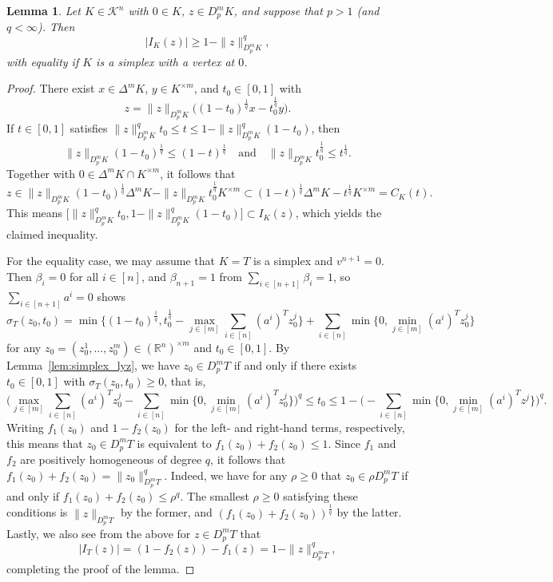 \documentclass{amsart}
\newtheorem{lemma}[theorem]{Lemma}
\newcommand\R{\mathbb{R}}
\newcommand\CK{\mathcal{K}}
\newcommand{\diff}[3]{D_{#1}^{#2} #3}
\newcommand{\diag}[2]{\Delta^{#1} #2}
\newcommand{\lyz}[4]{C_{#3} (#4)}
\newcommand{\interval}[4]{I_{#3} (#4)}
\newcommand{\sumfunc}[5]{\sigma_{#3}(#4,#5)}
\newcommand{\cartesian}[2]{#1^{\times #2}}
\begin{document}
\begin{lemma}\label{lem:general_iz}
Let $K \in \CK^n$ with $0 \in K$, $z \in \diff{p}{m}{K}$,
and suppose that $p > 1$ (and $q < \infty$).
Then
\[
	|\interval{p}{m}{K}{z}|
	\geq 1 - \|z\|_{\diff{p}{m}{K}}^q,
\]
with equality if $K$ is a simplex with a vertex at $0$.
\end{lemma}
\begin{proof}
There exist $x \in \diag{m}{K}$, $y \in \cartesian{K}{m}$, and $t_0 \in [0,1]$ with
\[
	z
	= \|z\|_{\diff{p}{m}{K}} \Big( (1-t_0)^{\frac{1}{q}} x - t_0^{\frac{1}{q}} y \Big).
\]
If $t \in [0,1]$ satisfies $\|z\|_{\diff{p}{m}{K}}^q t_0 \leq t \leq 1 - \|z\|_{\diff{p}{m}{K}}^q (1-t_0)$, then
\[
	\|z\|_{\diff{p}{m}{K}} (1-t_0)^{\frac{1}{q}} \leq (1-t)^{\frac{1}{q}}
		\quad \text{and} \quad
	\|z\|_{\diff{p}{m}{K}} t_0^{\frac{1}{q}} \leq t^{\frac{1}{q}}.
\]
Together with $0 \in \diag{m}{K} \cap \cartesian{K}{m}$, it follows that
\[
	z
	\in \|z\|_{\diff{p}{m}{K}} (1-t_0)^{\frac{1}{q}} \diag{m}{K} - \|z\|_{\diff{p}{m}{K}} t_0^{\frac{1}{q}} \cartesian{K}{m}
	\subset (1-t)^{\frac{1}{q}} \diag{m}{K} - t^{\frac{1}{q}} \cartesian{K}{m}
	= \lyz{p}{m}{K}{t}.
\]
This means $\big [\|z\|_{\diff{p}{m}{K}}^q t_0, 1 - \|z\|_{\diff{p}{m}{K}}^q (1-t_0) \big] \subset \interval{p}{m}{K}{z}$, which yields the claimed inequality.

For the equality case, we may assume that $K = T$ is a simplex and $v^{n+1} = 0$.
Then $\beta_i = 0$ for all $i \in [n]$, and $\beta_{n+1} = 1$ from $\sum_{i \in [n+1]} \beta_i = 1$, so $\sum_{i\in[n+1]} a^i = 0$ shows
\[
	\sumfunc{p}{m}{T}{z_0}{t_0}
	= \min \bigg\{ (1-t_0)^{\frac{1}{q}}, t_0^{\frac{1}{q}} - \max_{j \in [m]} \sum_{i \in [n]} (a^i)^T z_0^j \bigg\} + \sum_{i \in [n]} \min \bigg\{ 0, \min_{j \in [m]} (a^i)^T z_0^j \bigg\}
\]
for any $z_0 = (z_0^1, \dots, z_0^m) \in \cartesian{(\R^n)}{m}$ and $t_0 \in [0,1]$.
By Lemma~\ref{lem:simplex_lyz}, we have $z_0 \in \diff{p}{m}{T}$ if and only if there exists $t_0 \in [0,1]$ with $\sumfunc{p}{m}{T}{z_0}{t_0} \geq 0$, that is,
\[
	\Bigg( \max_{j \in [m]} \sum_{i \in [n]} (a^i)^T z_0^j - \sum_{i \in [n]} \min \bigg\{ 0, \min_{j \in [m]} (a^i)^T z_0^j \bigg\} \Bigg)^q
	\leq t_0
	\leq 1 - \Bigg( - \sum_{i \in [n]} \min \bigg\{ 0, \min_{j \in [m]} (a^i)^T z^j \bigg\} \Bigg)^q.
\]
Writing $f_1(z_0)$ and $1 - f_2(z_0)$ for the left- and right-hand terms, respectively,
this means that $z_0 \in \diff{p}{m}{T}$ is equivalent to $f_1(z_0) + f_2(z_0) \leq 1$.
Since $f_1$ and $f_2$ are positively homogeneous of degree $q$,
it follows that $f_1(z_0) + f_2(z_0) = \|z_0\|_{\diff{p}{m}{T}}^q$.
Indeed, we have for any $\rho \geq 0$ that $z_0 \in \rho \diff{p}{m}{T}$ if and only if $f_1(z_0) + f_2(z_0) \leq \rho^q$. The smallest $\rho \geq 0$ satisfying these conditions is $\|z\|_{\diff{p}{m}{T}}$ by the former, and $(f_1(z_0) + f_2(z_0))^{\frac{1}{q}}$ by the latter.
Lastly, we also see from the above for $z \in \diff{p}{m}{T}$ that
\[
	|\interval{p}{m}{T}{z}|
	= (1 - f_2(z)) - f_1(z)
	= 1 - \|z\|_{\diff{p}{m}{T}}^q,
\]
completing the proof of the lemma.
\end{proof}
\end{document}
